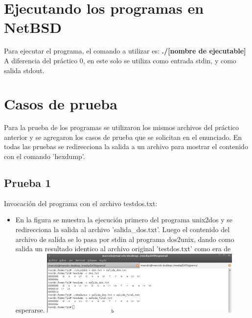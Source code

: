 \documentclass[a4paper,10pt]{article}
\begin{document}
\section{Ejecutando los programas en NetBSD}
  Para ejecutar el programa, el comando a utilizar es:
  \newline
  {\bf ./[nombre de ejecutable]}
  \newline
  A diferencia del pr\'actico 0, en este solo se utiliza como entrada stdin, y como salida stdout.

\section{Casos de prueba}
  Para la prueba de los programas se utilizaron los mismos archivos del pr\'actico anterior y se agregaron los casos de prueba que
  se solicitan en el enunciado. En todas las pruebas se redirecciona la salida a un archivo para mostrar el contenido con el comando 'hexdump'.
    \subsection{Prueba 1}
    Invocaci\'on del programa con el archivo testdos.txt:
    \begin{itemize}
      \item En la figura se muestra la ejecuci\'on primero del programa unix2dos y se redirecciona la salida al 	archivo 'salida\_dos.txt'. Luego el contenido del archivo de salida se lo pasa por stdin al programa dos2unix, dando como salida un resultado identico al archivo original 'testdos.txt' como era de esperarse.
      \newline
       \includegraphics[width=10cm, viewport=0 0 1018 324]{Imagenes/testdos.png}       
    \end{itemize}
\end{document}
